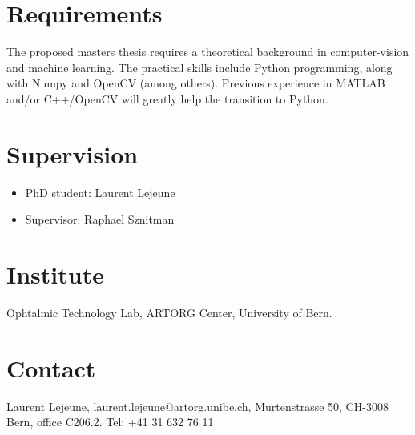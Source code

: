 \documentclass[11pt]{article}
\begin{document}
\section{Requirements}
\label{sec:orgheadline5}
The proposed masters thesis requires a theoretical background in computer-vision and machine learning. The practical skills include Python programming, along with Numpy and OpenCV (among others). Previous experience in MATLAB and/or C++/OpenCV will greatly help the transition to Python.
\section{Supervision}
\label{sec:orgheadline6}
\begin{itemize}
\item PhD student: Laurent Lejeune
\item Supervisor: Raphael Sznitman
\end{itemize}
\section{Institute}
\label{sec:orgheadline7}
Ophtalmic Technology Lab, ARTORG Center, University of Bern.
\section{Contact}
\label{sec:orgheadline8}
Laurent Lejeune, laurent.lejeune@artorg.unibe.ch, Murtenstrasse 50, CH-3008 Bern, office C206.2. Tel: +41 31 632 76 11





\printbibliography
\end{document}
